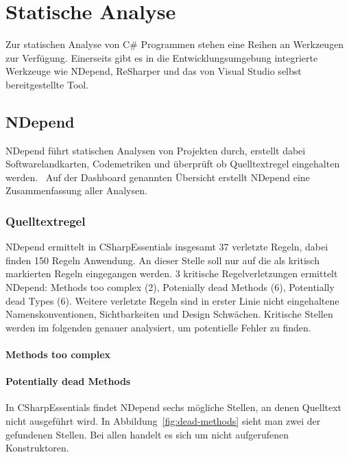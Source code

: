 %
\section{Statische Analyse}
Zur statischen Analyse von C\# Programmen stehen eine Reihen an Werkzeugen zur Verfügung. Einerseits gibt es in die Entwicklungsumgebung integrierte Werkzeuge wie NDepend, ReSharper und das von Visual Studio selbst bereitgestellte Tool.

\subsection{NDepend}
NDepend führt statischen Analysen von Projekten durch, erstellt dabei Softwarelandkarten, Codemetriken und überprüft ob Quelltextregel eingehalten werden.~\cite{ndepend} Auf der Dashboard genannten Übersicht erstellt NDepend eine Zusammenfassung aller Analysen.

\subsubsection{Quelltextregel}
NDepend ermittelt in CSharpEssentials insgesamt 37 verletzte Regeln, dabei finden 150 Regeln Anwendung. An dieser Stelle soll nur auf die als kritisch markierten Regeln eingegangen werden. 3 kritische Regelverletzungen ermittelt NDepend: Methods too complex (2), Potenially dead Methods (6), Potentially dead Types (6). Weitere verletzte Regeln sind in erster Linie nicht eingehaltene Namenskonventionen, Sichtbarkeiten und Design Schwächen. Kritische Stellen werden im folgenden genauer analysiert, um potentielle Fehler zu finden.

\paragraph{Methods too complex}

\paragraph{Potentially dead Methods} In CSharpEssentials findet NDepend sechs mögliche Stellen, an denen Quelltext nicht ausgeführt wird. In Abbildung~\ref{fig:dead-methods} sieht man zwei der gefundenen Stellen. Bei allen handelt es sich um nicht aufgerufenen Konstruktoren. 

